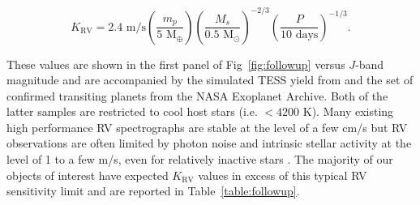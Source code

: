 \begin{equation}
  K_{\text{RV}} = 2.4 \text{ m/s} \left( \frac{m_p}{5 \text{ M}_{\oplus}} \right)
  \left( \frac{M_s}{0.5 \text{ M}_{\odot}} \right)^{-2/3} 
  \left( \frac{P}{10\text{ days}} \right)^{-1/3}.
\end{equation}

\noindent These values are shown in the first panel of Fig~\ref{fig:followup} versus $J$-band magnitude
and are accompanied by the simulated TESS yield from \cite{barclay18} and the set of
confirmed transiting planets from the NASA Exoplanet Archive.
Both of the latter samples are restricted to cool host stars (i.e. \teff{}
$<4200$ K). Many existing high performance RV spectrographs are stable at the level of a few cm/s but
RV observations are often limited by photon noise and intrinsic stellar activity at the level of 1 to a few
m/s, even for relatively inactive stars \citep{fischer16}. 
The majority of our objects of interest have expected $K_{\text{RV}}$ values in excess of this typical RV
sensitivity limit and are reported in Table~\ref{table:followup}. 



